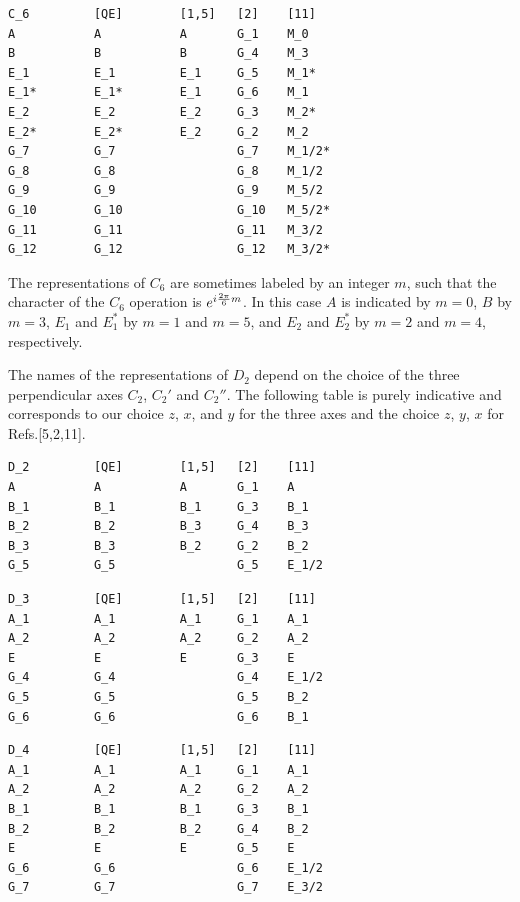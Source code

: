 \documentclass[12pt,a4paper]{article}
\begin{document}
\begin{verbatim}
C_6         [QE]        [1,5]   [2]    [11]    
A           A           A       G_1    M_0
B           B           B       G_4    M_3
E_1         E_1         E_1     G_5    M_1*
E_1*        E_1*        E_1     G_6    M_1
E_2         E_2         E_2     G_3    M_2*
E_2*        E_2*        E_2     G_2    M_2
G_7         G_7                 G_7    M_1/2*
G_8         G_8                 G_8    M_1/2
G_9         G_9                 G_9    M_5/2
G_10        G_10                G_10   M_5/2*
G_11        G_11                G_11   M_3/2
G_12        G_12                G_12   M_3/2*
\end{verbatim}
The representations of $C_6$ are sometimes labeled by an integer $m$,
such that the character of the $C_6$ operation is $e^{i {2\pi \over 6} m}$.
In this case $A$ is indicated by $m=0$, $B$ by $m=3$, $E_1$ and $E_1^*$ 
by $m=1$ and $m=5$, and $E_2$ and $E_2^*$ by $m=2$ and $m=4$, respectively.

The names of the representations of $D_2$ depend on the choice of the 
three perpendicular axes $C_2$, $C_2'$ and $C_2''$. The following table 
is purely indicative and corresponds to our choice $z$, $x$, and $y$ 
for the three axes and the choice $z$, $y$, $x$ for Refs.[5,2,11].
\begin{verbatim}
D_2         [QE]        [1,5]   [2]    [11] 
A           A           A       G_1    A
B_1         B_1         B_1     G_3    B_1
B_2         B_2         B_3     G_4    B_3
B_3         B_3         B_2     G_2    B_2
G_5         G_5                 G_5    E_1/2
\end{verbatim}

\begin{verbatim}
D_3         [QE]        [1,5]   [2]    [11]  
A_1         A_1         A_1     G_1    A_1
A_2         A_2         A_2     G_2    A_2
E           E           E       G_3    E
G_4         G_4                 G_4    E_1/2
G_5         G_5                 G_5    B_2
G_6         G_6                 G_6    B_1
\end{verbatim}

\begin{verbatim}
D_4         [QE]        [1,5]   [2]    [11] 
A_1         A_1         A_1     G_1    A_1
A_2         A_2         A_2     G_2    A_2
B_1         B_1         B_1     G_3    B_1
B_2         B_2         B_2     G_4    B_2
E           E           E       G_5    E
G_6         G_6                 G_6    E_1/2
G_7         G_7                 G_7    E_3/2
\end{verbatim}
\end{document}
